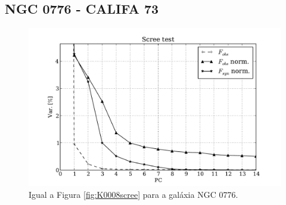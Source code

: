 \subsection{NGC 0776 - CALIFA 73}

\begin{figure}
    \includegraphics[height=0.33\textheight]{figuras/K0073-screetest.pdf}
    \caption[Scree test comparativo entre 3 PCAs - NGC 0776.]
    {Igual a Figura \ref{fig:K0008scree} para a galáxia NGC 0776.}
    \label{fig:K0073scree}
\end{figure}

